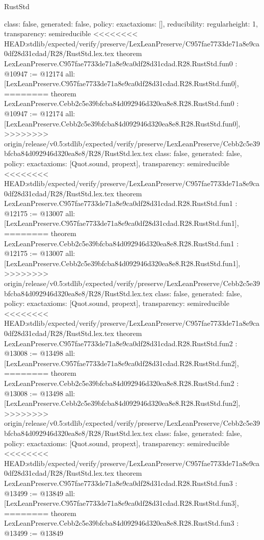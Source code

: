 \begin{lexlean}{RustStd}
\begin{coremodule}
{\begin{coremodule}
{{{  class: false,
  generated: false,
  policy: exact{axioms: []},
  reducibility: regular{height: 1},
  transparency: semireducible
}
<<<<<<<< HEAD:stdlib/expected/verify/preserve/LexLeanPreserve/C957fae7733de71a8e9ca0df28d31cdad/R28/RustStd.lex.tex
theorem LexLeanPreserve.C957fae7733de71a8e9ca0df28d31cdad.R28.RustStd.fun0 : @10947 := @12174 {
  all: [LexLeanPreserve.C957fae7733de71a8e9ca0df28d31cdad.R28.RustStd.fun0],
========
theorem LexLeanPreserve.Cebb2c5e39bfcba84d092946d320ea8e8.R28.RustStd.fun0 : @10947 := @12174 {
  all: [LexLeanPreserve.Cebb2c5e39bfcba84d092946d320ea8e8.R28.RustStd.fun0],
>>>>>>>> origin/release/v0.5:stdlib/expected/verify/preserve/LexLeanPreserve/Cebb2c5e39bfcba84d092946d320ea8e8/R28/RustStd.lex.tex
  class: false,
  generated: false,
  policy: exact{axioms: [Quot.sound, propext]},
  transparency: semireducible
}
<<<<<<<< HEAD:stdlib/expected/verify/preserve/LexLeanPreserve/C957fae7733de71a8e9ca0df28d31cdad/R28/RustStd.lex.tex
theorem LexLeanPreserve.C957fae7733de71a8e9ca0df28d31cdad.R28.RustStd.fun1 : @12175 := @13007 {
  all: [LexLeanPreserve.C957fae7733de71a8e9ca0df28d31cdad.R28.RustStd.fun1],
========
theorem LexLeanPreserve.Cebb2c5e39bfcba84d092946d320ea8e8.R28.RustStd.fun1 : @12175 := @13007 {
  all: [LexLeanPreserve.Cebb2c5e39bfcba84d092946d320ea8e8.R28.RustStd.fun1],
>>>>>>>> origin/release/v0.5:stdlib/expected/verify/preserve/LexLeanPreserve/Cebb2c5e39bfcba84d092946d320ea8e8/R28/RustStd.lex.tex
  class: false,
  generated: false,
  policy: exact{axioms: [Quot.sound, propext]},
  transparency: semireducible
}
<<<<<<<< HEAD:stdlib/expected/verify/preserve/LexLeanPreserve/C957fae7733de71a8e9ca0df28d31cdad/R28/RustStd.lex.tex
theorem LexLeanPreserve.C957fae7733de71a8e9ca0df28d31cdad.R28.RustStd.fun2 : @13008 := @13498 {
  all: [LexLeanPreserve.C957fae7733de71a8e9ca0df28d31cdad.R28.RustStd.fun2],
========
theorem LexLeanPreserve.Cebb2c5e39bfcba84d092946d320ea8e8.R28.RustStd.fun2 : @13008 := @13498 {
  all: [LexLeanPreserve.Cebb2c5e39bfcba84d092946d320ea8e8.R28.RustStd.fun2],
>>>>>>>> origin/release/v0.5:stdlib/expected/verify/preserve/LexLeanPreserve/Cebb2c5e39bfcba84d092946d320ea8e8/R28/RustStd.lex.tex
  class: false,
  generated: false,
  policy: exact{axioms: [Quot.sound, propext]},
  transparency: semireducible
}
<<<<<<<< HEAD:stdlib/expected/verify/preserve/LexLeanPreserve/C957fae7733de71a8e9ca0df28d31cdad/R28/RustStd.lex.tex
theorem LexLeanPreserve.C957fae7733de71a8e9ca0df28d31cdad.R28.RustStd.fun3 : @13499 := @13849 {
  all: [LexLeanPreserve.C957fae7733de71a8e9ca0df28d31cdad.R28.RustStd.fun3],
========
theorem LexLeanPreserve.Cebb2c5e39bfcba84d092946d320ea8e8.R28.RustStd.fun3 : @13499 := @13849 {
}}}}}}}
\end{coremodule}}
\end{coremodule}
\end{lexlean}
